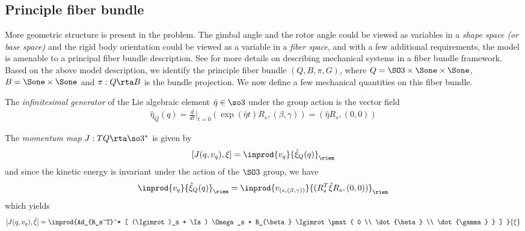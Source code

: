 \documentclass[11pt]{article}                %
\begin{document}
\subsection{Principle fiber bundle}
%
	      More geometric structure is present in the problem. The gimbal angle and the rotor angle 
	      could be viewed as variables in a {\it shape space (or base space)} and the rigid body 
	      orientation could be viewed as a variable in a {\it fiber space}, and with a few additional
	      requirements, the model is
	      amenable to a principal fiber bundle description. See \cite{} for more details on 
	      describing mechanical systems in a fiber bundle framework.
	      Based on the above model description, we identify the principle fiber bundle 
	      $(Q, B, \pi, G)$,
	      where $Q = \SO3 \times \Sone \times \Sone$, 
	      $B = \Sone \times \Sone $ and $\pi: Q \rta B$ is the bundle projection.
	       We now define
	      a few mechanical quantities on this fiber bundle. 
	      \bei
	      \item 
	      The {\it infinitesimal generator} of the Lie algebraic 
	      element $\hat{\eta} \in \so3$ under the group action is the vector field 
	      \begin{align}
	      \hat{\eta}_{Q}(q) = \frac{d}{dt}|_{t=0} (\exp(\hat{\eta}t) R_s, (\beta, \gamma)) = 
	                                 (\hat{\eta}R_s, (0, 0))
	      \end{align}
%
		\item The {\it momentum map} $J : TQ \rta \so3^*$ is given by
	      \begin{align}
	      [J(q, v_q), \xi] = \inprod{ v_q   }{  \hat{\xi}_Q(q) }_{\riem}
	      \end{align}
	      and 
	      since the kinetic energy is invariant under the action of the $\SO3$ group, we have
	       \begin{align}
	             \inprod{ v_q   }{  \hat{\xi}_Q(q) }_{\riem} = \inprod{ v_{(e,(\beta,\gamma))} }
	                                                                 {(R_s^T \hat{\xi} R_s,(0,0))  }_{\riem}
	       \end{align}
	       which yields
	       \begin{align}
	        [J(q, v_q), \hat{\xi}] =  \inprod{Ad_{R_s^T}^* [ (\Igimrot)_s + \Is) \Omega_s + R_{\beta} \Igimrot \pmat{ 0  \\  \dot{\beta}
	                                                      \\  \dot{\gamma} }   ] }{\xi}
	       \end{align}
\end{document}
